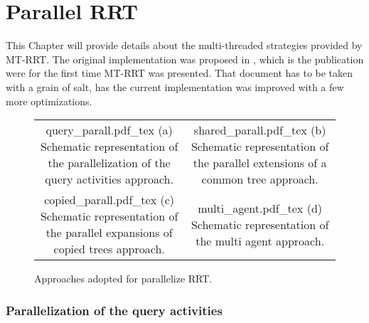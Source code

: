 \chapter{Parallel RRT}
\label{chap:parallel_RRT}

This Chapter will provide details about the multi-threaded strategies provided by MT-RRT. 
The original implementation was proposed in \cite{MT_RRT}, which is the publication were for the first time MT-RRT was presented.
That document has to be taken with a grain of salt, has the current implementation was improved with a few more optimizations.

 \begin{figure}
\begin{tabular}{cc}
\begin{minipage}[t]{0.49\textwidth}
 \def\svgwidth{0.69 \columnwidth}
 {query_parall.pdf_tex} 
 (a) Schematic representation of the parallelization of the query activities approach.
\end{minipage}
 &  
\begin{minipage}[t]{0.49\textwidth}
 \def\svgwidth{0.79 \columnwidth}
 {shared_parall.pdf_tex} 
 (b) Schematic representation of the parallel extensions of a common tree approach.
\end{minipage}
 \\
\begin{minipage}[t]{0.49\textwidth}
 \def\svgwidth{0.59 \columnwidth}
 {copied_parall.pdf_tex} 
 (c) Schematic representation of the parallel expansions of copied trees approach.
\end{minipage}
 & 
\begin{minipage}[t]{0.49\textwidth}
 \def\svgwidth{0.79 \columnwidth}
 {multi_agent.pdf_tex} 
 (d) Schematic representation of the multi agent approach. 
\end{minipage}
\end{tabular}
	 \caption{Approaches adopted for parallelize RRT.}
 \label{fig:parall_strategies}
\end{figure}

\subsection{Parallelization of the query activities}
\label{sec:strtg_query}

